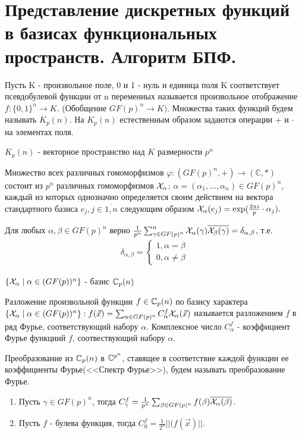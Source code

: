 \section {Представление дискретных функций в базисах функциональных пространств. Алгоритм БПФ. }

\opr Пусть K - произвольное поле, 0 и 1 - нуль и единица поля K  соответствует псевдобулевой функции от n переменных называется произвольное отображение $f:\{0,1\}^{n} \longrightarrow K$.
(Обобщение $ GF(p)^n \longrightarrow K)$.
Множества таких функций будем называть $K_p(n)$. На $K_p(n)$ естественным образом задаются операции + и $\cdot$ на элементах поля.

\utv $K_p(n)$ - векторное пространство над $K$ размерности $p^n$

\thr Множество всех различных гомоморфизмов $\varphi: (GF(p)^n,+) \longrightarrow (\mathbb{C},*)$ состоит из $p^n$ различных гомоморфизмов $\mathcal{X}_\alpha$; $\alpha = (\alpha_1,\dots, \alpha_n) \in GF(p)^n$, каждый из которых однозначно определяется своим действием на вектора стандартного базиса $e_j, j \in \overline{1, n}$
следующим образом $\mathcal{X}_\alpha(e_j) = \exp(\frac{2\pi i}{p}\cdot \alpha_j).$

\utv Для любых $\alpha,\beta \in GF(p)^n$ верно $\frac{1}{p^n}\sum_{\gamma \in GF(p)^n}^n \mathcal{X}_\alpha (\gamma) \overline {\mathcal{X}_\beta (\gamma )} = \delta_{\alpha,\beta}$, т.е.
\begin{align*}
    \delta_{\alpha, \beta} = 
    \begin{cases}
        1, \alpha = \beta \\
        0, \alpha \neq \beta
    \end{cases}
\end{align*}

\thr $\{ \mathcal{X}_\alpha \mid \alpha \in (GF(p))^n \}$ - базис $\mathbb{C}_p(n)$

\opr Разложение произвольной функции $f \in \mathbb{C}_p(n)$ по базису характера $\{ \mathcal{X}_\alpha \mid \alpha \in (GF(p))^n \}: f(\vec{x}) =  \sum_{\alpha \in GF(p)^n} C_\alpha^f \mathcal{X}_\alpha(\vec{x})$ называется разложением $f$ в ряд Фурье, соответствующий набору $\alpha$. Комплексное число $C_\alpha^f$ - коэффициент Фурье функциий $f$,
соотвествующий набору $\alpha$.

\opr Преобразование из $\mathbb{C}_p(n)$ в $\mathbb{C}^{p^n}$, ставящее в соответствие каждой функции ее коэффициенты Фурье(<<Спектр Фурье>>), будем называть преобразование Фурье.

\utv
\begin{enumerate}
    \item Пусть $\gamma \in GF(p)^n$, тогда $C_\gamma^f = \frac{1}{p^n}\sum_{\beta \in GF(p)^n} f(\beta) \overline{\mathcal{X}_\alpha(\beta)}$.
    \item Пусть $f$ - булева функция, тогда $C_0^f = \frac{1}{2^n}||(f(\vec{x})||$.
\end{enumerate}

